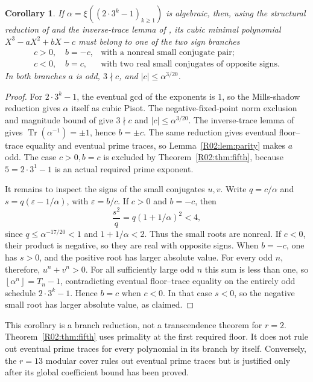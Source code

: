 \documentclass[11pt,a4paper]{article}
\newtheorem{corollary}[theorem]{Corollary}\newtheorem{mainthm}[theorem]{Theorem}
\theoremstyle{definition}\newtheorem{definition}[theorem]{Definition}
\theoremstyle{remark}\newtheorem{remark}[theorem]{Remark}
\newcommand{\floor}[1]{\left\lfloor#1\right\rfloor}
\DeclareMathOperator{\Tr}{Tr}\DeclareMathOperator{\tr}{tr}\DeclareMathOperator{\Nm}{N}
\begin{document}
\begin{corollary}\label{R02:cor:r2}
If $\alpha=\xi((2\cdot3^k-1)_{k\ge1})$ is algebraic, then, using
the structural reduction of \cite{K064} and the inverse-trace lemma
of \cite[Section~3]{N01}, its cubic minimal polynomial
$X^3-aX^2+bX-c$ must belong to one of the two sign branches
\[
 \begin{array}{ll}
 c>0,\quad b=-c,&\text{with a nonreal small conjugate pair};\\
 c<0,\quad b=c,&\text{with two real small conjugates of opposite signs}.
 \end{array}
\]
In both branches $a$ is odd, $3\nmid c$, and
$|c|\le\alpha^{3/20}$.
\end{corollary}
\begin{proof}
For $2\cdot3^k-1$, the eventual gcd of the exponents is $1$, so the
Mills-shadow reduction gives $\alpha$ itself as cubic Pisot. The
negative-fixed-point norm exclusion and magnitude bound of
\cite{K064} give $3\nmid c$ and $|c|\le\alpha^{3/20}$.
The inverse-trace lemma of \cite{N01} gives
$\Tr(\alpha^{-1})=\pm1$, hence $b=\pm c$.
The same reduction gives eventual floor--trace equality and eventual
prime traces, so Lemma~\ref{R02:lem:parity} makes $a$ odd.
The case $c>0,b=c$ is excluded by Theorem~\ref{R02:thm:fifth}, because
$5=2\cdot3^1-1$ is an actual required prime exponent.

It remains to inspect the signs of the small conjugates $u,v$.
Write $q=c/\alpha$ and
$s=q(\varepsilon-1/\alpha)$, with $\varepsilon=b/c$.
If $c>0$ and $b=-c$, then
\[
 \frac{s^2}{q}=q(1+1/\alpha)^2<4,
\]
since $q\le\alpha^{-17/20}<1$ and $1+1/\alpha<2$.
Thus the small roots are nonreal.
If $c<0$, their product is negative, so they are real with opposite
signs. When $b=-c$, one has $s>0$, and the positive root has larger
absolute value. For every odd $n$, therefore, $u^n+v^n>0$.
For all sufficiently large odd $n$ this sum is less than one, so
$\floor{\alpha^n}=T_n-1$, contradicting eventual floor--trace equality
on the entirely odd schedule $2\cdot3^k-1$.
Hence $b=c$ when $c<0$. In that case $s<0$, so the negative small
root has larger absolute value, as claimed.
\end{proof}

This corollary is a branch reduction, not a transcendence theorem for
$r=2$. Theorem~\ref{R02:thm:fifth} uses primality at the first required
floor. It does not rule out eventual prime traces for every polynomial
in its branch by itself. Conversely, the $r=13$ modular cover rules
out eventual prime traces but is justified only after its global
coefficient bound has been proved.
\end{document}
